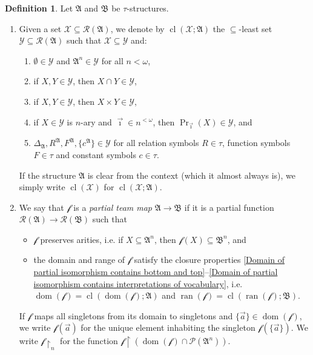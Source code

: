\documentclass[a4paper]{amsart}
\theoremstyle{definition}
\newtheorem{definition}{Definition}[section]
\theoremstyle{remark}
\renewcommand{\restriction}{ {\upharpoonright} }
\newcommand{\A}{\mathcal{A}}
\newcommand{\B}{\mathcal{B}}
\DeclareMathOperator{\Pow}{\wp}
\DeclareMathOperator{\dom}{dom}
\DeclareMathOperator{\ran}{ran}
\newcommand{\R}{\mathcal{R}}
\newcommand{\Y}{\mathcal{Y}}
\newcommand{\X}{\mathcal{X}}
\theoremstyle{definition}
\renewcommand{\A}{\mathfrak{A}}
\renewcommand{\B}{\mathfrak{B}}
\newcommand{\f}{\mathcal{f}}
\renewcommand{\Pow}{\mathcal{P}}
\DeclareMathOperator{\cl}{cl}
\begin{document}
\begin{definition}\label{definition.team.maps}
    Let $\A$ and $\B$ be $\tau$-structures.
    \begin{enumerate}
        \item Given a set $\X\subseteq\R(\A)$, we denote by $\cl(\X;\A)$ the $\subseteq$-least set $\Y\subseteq\R(\A)$ such that $\X\subseteq\Y$ and:
        \begin{enumerate}[label = (C\arabic*)]
            \item\label{Domain of partial isomorphism contains bottom and top}
            $\emptyset\in\Y$ and $\A^n\in\Y$ for all $n<\omega$,
            \item\label{Domain of partial isomorphism closed under meets}
            if $X,Y\in\Y$, then $X\cap Y\in\Y$,
            \item\label{Domain of partial isomorphism closed under products}
            if $X,Y\in\Y$, then $X\times Y\in\Y$,
            \item\label{Domain of partial isomorphism closed under projections}
            if $X\in\Y$ is $n$-ary and $\vec\imath\in n^{<\omega}$, then $\Pr_{\vec\imath}(X)\in\Y$, and
            \item\label{Domain of partial isomorphism contains interpretations of vocabulary}
            $\Delta_\A,R^\A,F^\A,\{c^\A\}\in\Y$ for all relation symbols $R\in\tau$, function symbols $F\in\tau$ and constant symbols $c\in\tau$.
        \end{enumerate}
        If the structure $\A$ is clear from the context (which it almost always is), we simply write $\cl(\X)$ for $\cl(\X;\A)$.
        \item We say that $\f$ is a \emph{partial team map} $\A\to\B$ if it is a partial function $\R(\A)\to\R(\B)$ such that
        \begin{itemize}
            \item $\f$ preserves arities, i.e. if $X\subseteq\A^n$, then $\f(X)\subseteq\B^n$, and
            \item the domain and range of $\f$ satisfy the closure properties \ref{Domain of partial isomorphism contains bottom and top}--\ref{Domain of partial isomorphism contains interpretations of vocabulary}, i.e. $\dom(\f) = \cl(\dom(\f);\A)$ and $\ran(\f) = \cl(\ran(\f);\B)$.
        \end{itemize}
        If $\f$ maps all singletons from its domain to singletons and $\{\vec a\}\in\dom(\f)$, we write $\f(\vec a)$ for the unique element inhabiting the singleton $\f(\{\vec a\})$. We write $\f\restriction_n$ for the function $\f\restriction(\dom(\f)\cap\Pow(\A^n))$.


\end{enumerate}
\end{definition}
\end{document}
